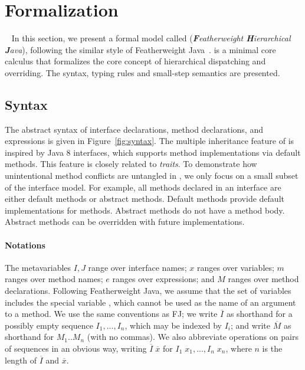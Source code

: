 \section{Formalization}~\label{sec:formalization}
In this section, we present a formal model called \MIM{} (\emph{\textbf{F}eatherweight \textbf{H}ierarchical \textbf{J}ava}), following the similar style of 
Featherweight Java~\cite{Igarashi01FJ}. \MIM{} is a minimal core calculus that formalizes the core concept of hierarchical dispatching and overriding. The syntax, typing rules and small-step semantics are presented.

\subsection{Syntax}
The abstract syntax of \MIM{} interface declarations, method declarations, and expressions is given in Figure~\ref{fig:syntax}. The multiple
inheritance feature of \MIM{} is inspired by Java 8 interfaces, which supports
method implementations via default methods. This feature is 
closely related to \emph{traits}. To demonstrate how
unintentional method conflicts are untangled in \MIM{}, we only focus on a small subset of the interface model. For example, all methods declared
in an interface are either default methods or abstract methods. Default methods provide default implementations for methods. Abstract methods do not
have a method body. Abstract methods can be overridden with future implementations.

\paragraph{Notations}
The metavariables $I, J$ range over interface names; $x$ ranges over variables; $m$ ranges over method names; $e$ ranges over expressions; and $M$ ranges over method declarations. Following Featherweight Java, we assume that the set of variables includes the special variable \kwthis, which cannot be used as the name of an argument to a method. We use the same
conventions as FJ; we write $\overline{I}$ as shorthand for a possibly empty sequence $I_1, ..., I_n$, which may be indexed by $I_i$; and write $\overline{M}$ as shorthand for $M_1 .. M_n$ (with no commas). We also abbreviate operations on pairs of sequences in an obvious way, writing $\overline{I} \; \overline{x}$ for $I_1 \; x_1, ..., I_n \; x_n$, where $n$ is the length of $\overline{I}$ and $\overline{x}$.

